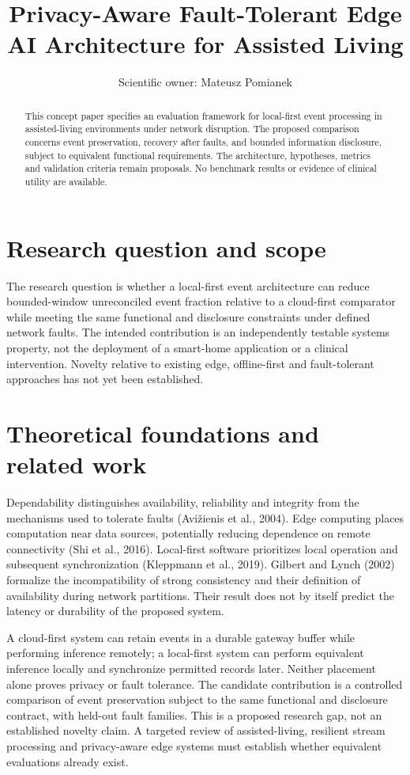 \documentclass[11pt,a4paper]{article}
\title{Privacy-Aware Fault-Tolerant Edge AI Architecture for Assisted Living}
\author{Scientific owner: Mateusz Pomianek}
\date{}
\begin{document}
\maketitle

\begin{abstract}
This concept paper specifies an evaluation framework for local-first event processing in assisted-living environments under network disruption. The proposed comparison concerns event preservation, recovery after faults, and bounded information disclosure, subject to equivalent functional requirements. The architecture, hypotheses, metrics and validation criteria remain proposals. No benchmark results or evidence of clinical utility are available.
\end{abstract}

\section{Research question and scope}
The research question is whether a local-first event architecture can reduce bounded-window unreconciled event fraction relative to a cloud-first comparator while meeting the same functional and disclosure constraints under defined network faults. The intended contribution is an independently testable systems property, not the deployment of a smart-home application or a clinical intervention. Novelty relative to existing edge, offline-first and fault-tolerant approaches has not yet been established.

\section{Theoretical foundations and related work}
Dependability distinguishes availability, reliability and integrity from the mechanisms used to tolerate faults (Avi\v{z}ienis et al., 2004). Edge computing places computation near data sources, potentially reducing dependence on remote connectivity (Shi et al., 2016). Local-first software prioritizes local operation and subsequent synchronization (Kleppmann et al., 2019). Gilbert and Lynch (2002) formalize the incompatibility of strong consistency and their definition of availability during network partitions. Their result does not by itself predict the latency or durability of the proposed system.

A cloud-first system can retain events in a durable gateway buffer while performing inference remotely; a local-first system can perform equivalent inference locally and synchronize permitted records later. Neither placement alone proves privacy or fault tolerance. The candidate contribution is a controlled comparison of event preservation subject to the same functional and disclosure contract, with held-out fault families. This is a proposed research gap, not an established novelty claim. A targeted review of assisted-living, resilient stream processing and privacy-aware edge systems must establish whether equivalent evaluations already exist.
\end{document}
